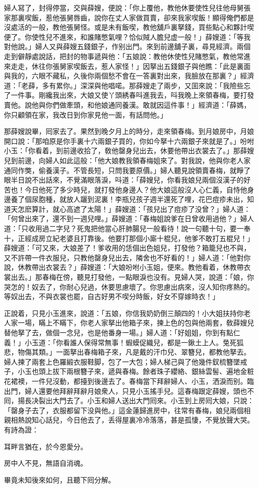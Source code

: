 婦人冩了，封得停當，交與薛嫂，便說：「你上覆他，教他休要使性兒往他母舅張家那裏喫飯，惹他張舅唇齒，說你在丈人家做買賣，卻來我家喫飯！顯得俺們都是沒處活的一般，教他張舅怪。或是未有飯喫，教他舖戶裏拏錢，買些點心和夥計喫便了。你使性兒不進來，和誰賭憋氣哩？恰似賊人膽兒虚一般！」薛嫂道：「等我對他說。」婦人又與薛嫂五錢銀子，作别出門。來到前邊舖子裏，尋見經濟。兩個走到僻靜處說話，把封的物事遞與他：「五娘說：教他休使性兒賭憋氣，教他常進來走走，休往你張舅家喫飯去，惹人家怪！」因拏出五錢銀子與他瞧：「此是裏面與我的，六眼不藏私，久後你兩個愁不會在一答裏對出來，我臉放在那裏？」經濟道：「老薛，多有累你。」深深與他唱喏。那薛嫂走了兩步，又囬來說：「我險些忘了一件事。剛纔我出來，大娘又使丫頭綉春呌進我去，呌我晚上來領春梅，要打發賣他。說他與你們做牽頭，和他娘通同養漢。敢就因這件事！」經濟道：「薛媽，你只顧領在家，我改日到你家見他一面，有話問他。」

那薛嫂說畢，囘家去了。果然到晚夕月上的時分，走來領春梅。到月娘房中，月娘開口說：「那咱原是你手裏十六兩銀子買的，你如今拏十六兩銀子來就是了。」吩咐小玉：「你看着，到前邊收拾了，敎他罄身兒出去，休要他帶出衣裳去了。」那薛嫂兒到前邊，向婦人如此這般：「他大娘教我領春梅姐來了。對我說，他與你老人家通同作獘，偷養漢子。不管長短，只問我要原價。」婦人聽見說領賣春梅，就睜了眼半日說不出話來，不覺滿眼落淚，呌道：「薛嫂兒，你看我娘兒兩個沒漢子的好苦也！今日他死了多少時兒，就打發他身邊人？他大娘這般沒人心仁義，自恃他身邊養了個尿胞種，就放人躧到泥裏！李瓶兒孩子週半還死了哩，花巴痘疹未出，知道天怎麽算計，就心高遮了太陽！」薛嫂道：「孩兒出了痘疹了没曾？」婦人道：「何曾出來了，還不到一週兒哩。」薛嫂道：「春梅姐說爹在日曾收用過他？」婦人道：「只收用過二字兒？死鬼把他當心肝肺腸兒一般看待！說一句聽十句，要一奉十，正經成房立紀老婆且打靠後。他要打那個小廝十棍兒，他爹不敢打五棍兒！」薛嫂道：「可又來，大娘差了！爹收用的恁個出色姐兒，打發他？箱籠兒也不與，又不許帶一件衣服兒，只教他罄身兒出去，隣舍也不好看的！」婦人道：「他對你說，休教帶出衣裳去？」薛嫂道：「大娘吩咐小玉姐，便來。教他看着，休教帶衣裳出去。」那春梅在傍，聽見打發他，一點眼淚也没有。見婦人哭，說道：「娘，你哭怎的！奴去了，你耐心兒過，休要思慮壞了。你思慮出病來，沒人知你疼熱的。等奴出去，不與衣裳也罷，自古好男不喫分時飯，好女不穿嫁時衣！」

正說着，只見小玉進來，說道：「五娘，你信我奶奶倒三顛四的！小大姐扶持你老人家一場，瞞上不瞞下，你老人家拏出他箱子來，揀上色的包與他兩套，敎薛嫂兒替他拏了去，做個一念兒，也是他番身一場。」婦人道：「好姐姐，你到有點仁義！」小玉道：「你看誰人保得常無事！蝦蟆促織兒，都是一鍬土上人。兔死狐悲，物傷其類。」一面拏出春梅箱子來，凡是戴的汗巾兒、翠簪兒，都教他拏去。婦人揀了兩套上色羅緞衣服鞋脚，包了一大包；婦人梯己與了他幾件釵梳簪墜戒子，小玉也頭上拔下兩根簪子來，遞與春梅。餘者珠子纓絡、銀絲雲髻、遍地金粧花裙襖，一件兒沒動，都擡到後邊去了。春梅當下拜辭婦人、小玉，洒淚而别。臨出門，婦人還要他拜辭拜辭月娘衆人，只見小玉搖手兒。這春梅跟定薛嫂，頭也不囘，揚長决裂出大門去了。小玉和婦人送出大門囘來。小玉到上房囘大娘，只說：「罄身子去了，衣服都留下没與他。」這金蓮歸進房中，往常有春梅，娘兒兩個相親相熱說知心話兒，今日他去了，丢得屋裏冷冷落落，甚是孤悽，不覺放聲大哭。有詩為證：

\begin{myquote}
耳畔言猶在，於今恩愛分。

房中人不見，無語自消魂。
\end{myquote}

畢竟未知後來如何，且聽下囘分解。

